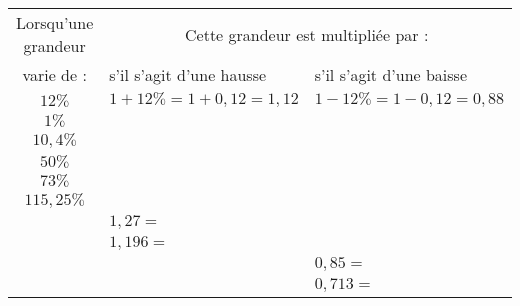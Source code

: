 \documentclass[10pt,openright,twoside,french]{book}
\begin{document}
\begin{enumerate}
    \begin{center}
        \renewcommand\arraystretch{1.75}
        \begin{tabularx}{0.95\linewidth}{|c|X|X|}
            \hline
                Lorsqu'une grandeur & \multicolumn{2}{c|}{Cette grandeur est multipliée par :}\\
                \cline{2-3}
                varie de : & s'il s'agit d'une hausse & s'il s'agit d'une baisse \\
            \hline
                $12\%$ & $1 + 12\% = 1 + 0{,}12 = 1{,}12$ & $1 - 12\% = 1 - 0{,}12 = 0{,}88$\\
            \hline
                $1\%$ & & \\
            \hline
                $10{,}4\%$ & & \\
            \hline
                $50\%$ & & \\
            \hline
                $73\%$ & & \\
            \hline
                $115{,}25\%$ & & \\
            \hline
                & $1{,}27 =$ & \\
            \hline
                & $1{,}196 =$ & \\
            \hline
                & & $0{,}85 =$ \\
            \hline
                & & $0{,}713 =$\\
            \hline
        \end{tabularx}
    \end{center}
\end{enumerate}
\end{document}
